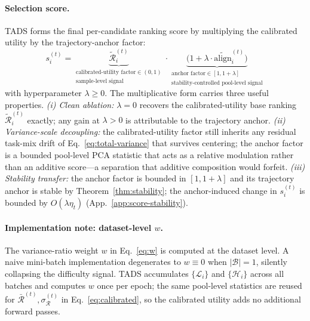 \paragraph{Selection score.}
\textsc{TADS} forms the final per-candidate ranking score by
multiplying the calibrated utility by the trajectory-anchor factor:
\begin{equation}
\boxed{
s_i^{(t)}
=
\underbrace{\tilde{\mathcal{R}}_i^{(t)}}_{\substack{\text{calibrated-utility factor} \in (0,1)\\[1pt]
\text{sample-level signal}}}
\cdot
\underbrace{\bigl(1+\lambda \cdot \widetilde{\mathrm{align}}_i^{(t)}\bigr)}_{\substack{\text{anchor factor} \in [1, 1+\lambda]\\[1pt]
\text{stability-controlled pool-level signal}}}
}
\label{eq:score}
\end{equation}
with hyperparameter $\lambda \ge 0$. The multiplicative form
carries three useful properties. \emph{(i) Clean ablation:}
$\lambda{=}0$ recovers the calibrated-utility base ranking
$\tilde{\mathcal{R}}_i^{(t)}$ exactly; any gain at $\lambda>0$ is
attributable to the trajectory anchor. \emph{(ii) Variance-scale
decoupling:} the calibrated-utility factor still inherits any
residual task-mix drift of Eq.~\ref{eq:total-variance} that
survives centering; the anchor factor is a bounded pool-level PCA
statistic that acts as a relative modulation rather than an
additive score---a separation that additive composition would
forfeit. \emph{(iii) Stability transfer:} the anchor factor is
bounded in $[1, 1+\lambda]$ and its trajectory anchor is stable by
Theorem~\ref{thm:stability}; the anchor-induced change in
$s_i^{(t)}$ is bounded by $O(\lambda\eta_t)$
(App.~\ref{app:score-stability}).


\paragraph{Implementation note: dataset-level $w$.}
The variance-ratio weight $w$ in Eq.~\ref{eq:w} is computed at the
dataset level. A naive mini-batch implementation degenerates to
$w \equiv 0$ when $|\mathcal{B}|=1$, silently collapsing the
difficulty signal. \textsc{TADS} accumulates $\{\mathcal{L}_i\}$
and $\{\mathcal{H}_i\}$ across all batches and computes $w$ once
per epoch; the same pool-level statistics are reused for
$\bar{\mathcal{R}}^{(t)}, \sigma_{\mathcal{R}}^{(t)}$ in
Eq.~\ref{eq:calibrated}, so the calibrated utility adds no
additional forward passes.

